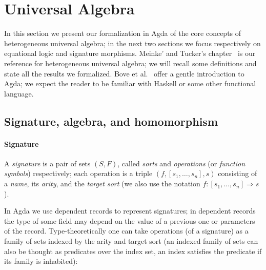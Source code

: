 \section{Universal Algebra}
\label{sec:univ-alg}

In this section we present our formalization in Agda of the core
concepts of heterogeneous universal algebra; in the next two sections
we focus respectively on equational logic and signature morphisms.
Meinke' and Tucker's chapter~\cite{meinke-tucker-1992} is our
reference for heterogeneous universal algebra; we will recall some
definitions and state all the results we formalized. Bove et
al.~\cite{agda-intro} offer a gentle introduction to Agda; we expect
the reader to be familiar with Haskell or some other functional
language.

\subsection{Signature, algebra, and homomorphism}

\paragraph*{Signature}

A \emph{signature} is a pair of sets $(S,F)$, called \textit{sorts}
and \textit{operations} (or \textit{function symbols}) respectively;
each operation is a triple $(f,[s_1,\ldots,s_n],s)$ consisting of a
\textit{name}, its \textit{arity}, and the \textit{target sort} (we
also use the notation $f \colon [s_1,...,s_n] \Rightarrow s$).

In Agda we use dependent records to represent signatures; in dependent
records the type of some field may depend on the value of a previous
one or parameters of the record. Type-theoretically one can take
operations (of a signature) as a family of sets indexed by the arity and target sort
(an indexed family of sets can also be thought as predicates over the
index set, an index satisfies the predicate if its family is
inhabited):
\begin{code}
\>[0]\AgdaSpace{}%
\AgdaSpace{}%
\AgdaSymbol{:}\AgdaSpace{}%
\AgdaSpace{}%
\<%
\\
\>[0][@{}l@{\AgdaIndent{0}}]%
\>[2]\<%
\\
\>[2][@{}l@{\AgdaIndent{0}}]%
\>[4]%
\>[11]\AgdaSymbol{:}%
\>[15]\<%
\\
%
\>[4]%
\>[11]\AgdaSymbol{:}%
\>[15]\AgdaSpace{}%
\AgdaSpace{}%
\AgdaSpace{}%
\AgdaSpace{}%
\AgdaSpace{}%
\<%
\end{code}

